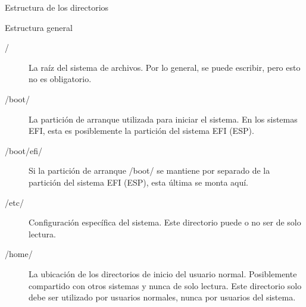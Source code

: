 \begin{frame}[c]{Estructura de los directorios}
\end{frame}

\begin{frame}[c]{Estructura general}
  \begin{description}
    \item [/] La raíz del sistema de archivos. Por lo general, se puede
			escribir, pero esto no es obligatorio.
		\item [/boot/] La partición de arranque utilizada para iniciar el sistema.
			En los sistemas EFI, esta es posiblemente la partición del sistema EFI
			(ESP).
		\item [/boot/efi/] Si la partición de arranque /boot/ se mantiene
			por separado de la partición del sistema EFI (ESP), esta última se monta
			aquí.
		\item [/etc/] Configuración específica del sistema. Este directorio puede
			o no ser de solo lectura.
		\item [/home/] La ubicación de los directorios de inicio del usuario
			normal. Posiblemente compartido con otros sistemas y nunca de solo
			lectura. Este directorio solo debe ser utilizado por usuarios normales,
			nunca por usuarios del sistema.
  \end{description}
\end{frame}

